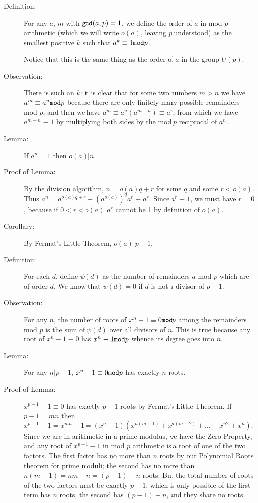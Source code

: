 \documentclass[12pt]{article}
\begin{document}
\begin{description}

\item[Definition:]  For any $a$, $m$ with ${\tt gcd}(a,p)=1$, we define the order of $a$ in mod $p$ arithmetic (which we will write $o(a)$, leaving
$p$ understood) as the smallest positive $k$ such that $a^k\equiv 1{\tt mod}p$.

Notice that this is the same thing as the order of $a$ in the group $U(p)$.

\item[Observation:]  There is such an $k$:  it is clear that for some two numbers $m>n$ we have $a^m\equiv a^n{\tt mod}p$ because there are only finitely many
possible remainders mod $p$, and then we have $a^m\equiv a^n(a^{m-n})\equiv a^n$, from which we have $a^{m-n}\equiv 1$ by multiplying both sides by the mod $p$ reciprocal of $a^n$.

\item[Lemma:]  If $a^n=1$ then $o(a)|n$.

\item[Proof of Lemma:]  By the division algorithm, $n=o(a)q+r$ for some $q$ and some $r<o(a)$.  Thus $a^n=a^{o(a)q+r}\equiv (a^{o(a)})^qa^r\equiv a^r$.
Since $a^r\equiv 1$, we must have $r=0$, because if $0<r<o(a)$ $a^r$ cannot be 1 by definition of $o(a)$.

\item[Corollary:]  By Fermat's Little Theorem, $o(a)|p-1$.

\item[Definition:]   For each $d$, define $\psi(d)$ as the number of remainders $a$ mod $p$ which are of order $d$.  We know that $\psi(d)=0$ if $d$ is not a divisor of
$p-1$.

\item[Observation:]   For any $n$, the number of roots of $x^n-1 \equiv 0{\tt mod}p$ among the remainders mod $p$ is the sum of $\psi(d)$ over all divisors of $n$.
This is true because any root of $x^n-1 \equiv 0$ has $x^n\equiv 1{\tt mod}p$ whence its degree goes into $n$.

\item[Lemma:]  For any $n|p-1$, $x^n-1 \equiv 0{\tt mod}p$  has exactly $n$ roots.

\item[Proof of Lemma:] $x^{p-1}-1 \equiv 0$ has exactly $p-1$ roots by Fermat's Little Theorem.   If $p-1=mn$ then $x^{p-1}-1=x^{mn}-1=(x^n-1)(x^{n(m-1)}+x^{n(m-2)}+\ldots+x^{n2}+x^n)$.   Since we are in arithmetic in a prime modulus,
we have the Zero Property, and any root of $x^{p-1}-1$ in mod $p$ arithmetic is a root of one of the two factors.  The first factor has no more than $n$ roots by our Polynomial Roots theorem for prime moduli; the second has no more
than $n(m-1)=nm-n=(p-1)-n$ roots.  But the total number of roots of the two factors must be exactly $p-1$, which is only possible of the first term has $n$ roots, the second has $(p-1)-n$, and they share no roots.


\end{description}
\end{document}
